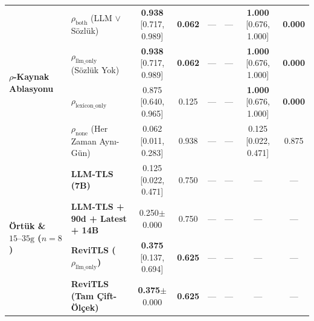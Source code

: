 ﻿\documentclass[journal]{IEEEtran}
\begin{document}
\begin{table}[t]
{\begin{tabular}{@{}ll cc cc cc@{}}
\midrule
\multirow{4}{*}{\textbf{$\rho$-Kaynak Ablasyonu}}
  & $\rho_{\text{both}}$ (LLM $\lor$ S\"{o}zl\"{u}k) & \textbf{0.938} [0.717, 0.989] & \textbf{0.062} & --- & --- & \textbf{1.000} [0.676, 1.000] & \textbf{0.000} \\
  & $\rho_{\text{llm\_only}}$ (S\"{o}zl\"{u}k Yok) & \textbf{0.938} [0.717, 0.989] & \textbf{0.062} & --- & --- & \textbf{1.000} [0.676, 1.000] & \textbf{0.000} \\
  & $\rho_{\text{lexicon\_only}}$ & 0.875 [0.640, 0.965] & 0.125 & --- & --- & \textbf{1.000} [0.676, 1.000] & \textbf{0.000} \\
  & $\rho_{\text{none}}$ (Her Zaman Ayn{\i}-G\"{u}n) & 0.062 [0.011, 0.283] & 0.938 & --- & --- & 0.125 [0.022, 0.471] & 0.875 \\
\midrule
\multirow{4}{*}{\textbf{\"{O}rt\"{u}k \& $15\text{--}35\text{g}$ ($n=8$)}}
  & \textbf{LLM-TLS (7B)} & 0.125 [0.022, 0.471] & 0.750 & --- & --- & --- & --- \\
  & \textbf{LLM-TLS + 90d + Latest + 14B} & 0.250{\tiny$\pm$0.000} & 0.750 & --- & --- & --- & --- \\
  & \textbf{ReviTLS ($\rho_{\text{llm\_only}}$)} & \textbf{0.375} [0.137, 0.694] & \textbf{0.625} & --- & --- & --- & --- \\
  & \textbf{ReviTLS (Tam \c{C}ift-\"{O}l\c{c}ek)} & \textbf{0.375}{\tiny$\pm$0.000} & \textbf{0.625} & --- & --- & --- & --- \\
\bottomrule
\end{tabular}%
}
\end{table}
\end{document}
